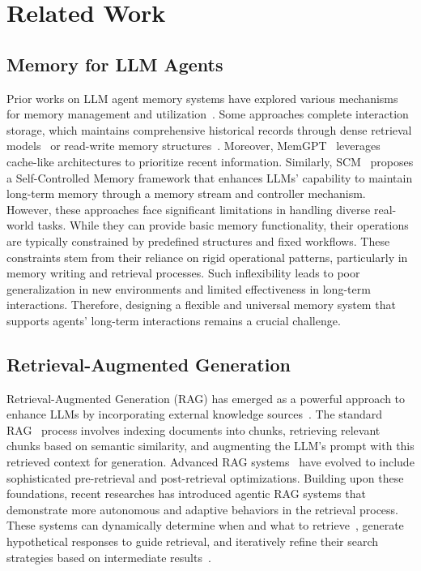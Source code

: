 \section{Related Work}
\subsection{Memory for LLM Agents}
Prior works on LLM agent memory systems have explored various mechanisms for memory management and utilization~\cite{aios,agentlite,mem0,memorybank}. Some approaches complete interaction storage, which maintains comprehensive historical records through dense retrieval models~\cite{memorybank} or read-write memory structures~\cite{modarressi2023ret}. Moreover, MemGPT~\cite{memgpt} leverages cache-like architectures to prioritize recent information. Similarly, SCM~\cite{wang2023enhancing} proposes a Self-Controlled Memory framework that enhances LLMs' capability to maintain long-term memory through a memory stream and controller mechanism.
However, these approaches face significant limitations in handling diverse real-world tasks. While they can provide basic memory functionality, their operations are typically constrained by predefined structures and fixed workflows. These constraints stem from their reliance on rigid operational patterns, particularly in memory writing and retrieval processes. Such inflexibility leads to poor generalization in new environments and limited effectiveness in long-term interactions. Therefore, designing a flexible and universal memory system that supports agents' long-term interactions remains a crucial challenge.


\subsection{Retrieval-Augmented Generation}
Retrieval-Augmented Generation (RAG) has emerged as a powerful approach to enhance LLMs by incorporating external knowledge sources~\cite{rag1,borgeaud2022improving,gao2023retrieval}. The standard RAG~\cite{yu2023chain,wang2023learning} process involves indexing documents into chunks, retrieving relevant chunks based on semantic similarity, and augmenting the LLM's prompt with this retrieved context for generation. Advanced RAG systems~\cite{lin2023ra,ilin2023advanced} have evolved to include sophisticated pre-retrieval and post-retrieval optimizations.
Building upon these foundations, recent researches has introduced agentic RAG systems that demonstrate more autonomous and adaptive behaviors in the retrieval process. These systems can dynamically determine when and what to retrieve~\cite{asai2023self,jiang2023active}, generate hypothetical responses to guide retrieval, and iteratively refine their search strategies based on intermediate results~\cite{trivedi2022interleaving,shao2023enhancing}. 

